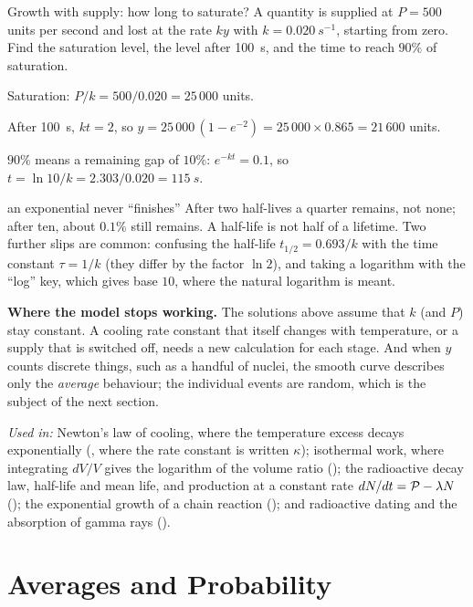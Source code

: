 \begin{exbox}{Growth with supply: how long to saturate?}
A quantity is supplied at $P=500$ units per second and lost at the rate $ky$ with $k=\SI{0.020}{s^{-1}}$,
starting from zero. Find the saturation level, the level after \SI{100}{s}, and the time to reach $90\%$
of saturation.

 Saturation: $P/k=500/0.020=25\,000$ units.

 After \SI{100}{s}, $kt=2$, so $y=25\,000\,(1-e^{-2})=25\,000\times0.865=21\,600$ units.

 $90\%$ means a remaining gap of $10\%$: $e^{-kt}=0.1$, so $t=\ln10/k=2.303/0.020=\SI{115}{s}$.
\end{exbox}

\begin{trapbox}{an exponential never ``finishes''}
After two half-lives a quarter remains, not none; after ten, about $0.1\%$ still remains. A half-life is
not half of a lifetime. Two further slips are common: confusing the half-life $t_{1/2}=0.693/k$ with the
time constant $\tau=1/k$ (they differ by the factor $\ln2$), and taking a logarithm with the
``log'' key, which gives base $10$, where the natural logarithm is meant.
\end{trapbox}

\textbf{Where the model stops working.} The solutions above assume that $k$ (and $P$) stay constant. A
cooling rate constant that itself changes with temperature, or a supply that is switched off, needs a new
calculation for each stage. And when $y$ counts discrete things, such as a handful of nuclei, the smooth
curve describes only the \emph{average} behaviour; the individual events are random, which is the
subject of the next section.

\medskip\noindent
\emph{Used in:} Newton's law of cooling, where the temperature excess decays exponentially
(, where the rate constant is written $\kappa$); isothermal work, where integrating $dV/V$ gives the logarithm of the volume ratio ();
the radioactive decay law, half-life and mean life, and production at a constant rate
$dN/dt=\mathcal{P}-\lambda N$ (); the exponential growth of a chain reaction
(); and radioactive dating and the absorption of gamma rays ().

\section{Averages and Probability}\label{sec:averages}

